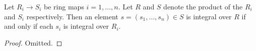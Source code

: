 \begin{lemma}
\label{lemma-finite-product-integral}
Let $R_i\to S_i$ be ring maps $i = 1, \ldots, n$.
Let $R$ and $S$ denote the product of the $R_i$ and $S_i$ respectively.
Then an element $s = (s_1, \ldots, s_n) \in S$ is integral over $R$
if and only if each $s_i$ is integral over $R_i$.
\end{lemma}

\begin{proof}
Omitted.
\end{proof}